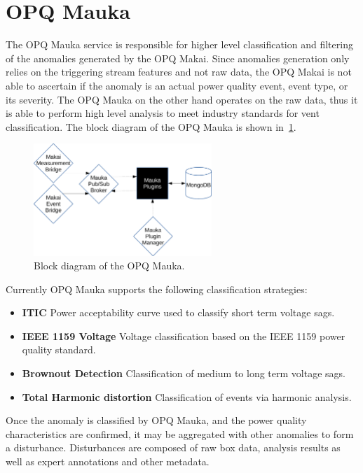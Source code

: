 \section{OPQ Mauka}\label{sec:opq-mauka}
The OPQ Mauka service is responsible for higher level classification and filtering of the anomalies generated by the OPQ Makai.\cite{laha}
Since anomalies generation only relies on the triggering stream features and not raw data, the OPQ Makai is not able to ascertain if the anomaly is an actual power quality event, event type, or its severity.
The OPQ Mauka on the other hand operates on the raw data, thus it is able to perform high level analysis to meet industry standards for vent classification.
The block diagram of the OPQ Mauka is shown in~\ref{fig:opq:11}.
\begin{figure}[h]
  \begin{center}
  \includegraphics[width=0.6\textwidth]{img/mauka.pdf}
  \end{center}
  \caption{Block diagram of the OPQ Mauka.}
  \label{fig:opq:11}
\end{figure}

Currently OPQ Mauka supports the following classification strategies:
\begin{itemize}
	\item{\textbf{ITIC}} Power acceptability curve used to classify short term voltage sags.
	\item{\textbf{IEEE 1159 Voltage}} Voltage classification based on the IEEE 1159 power quality standard.
	\item{\textbf{Brownout Detection}} Classification of medium to long term voltage sags.
	\item{\textbf{Total Harmonic distortion}} Classification of events via harmonic analysis.
\end{itemize}

Once the anomaly is classified by OPQ Mauka, and the power quality characteristics are confirmed, it may be aggregated with other anomalies to form a disturbance.
Disturbances are composed of raw box data, analysis results as well as expert annotations and other metadata.

